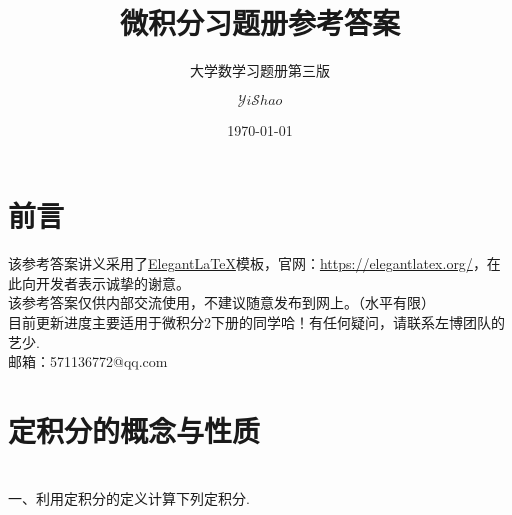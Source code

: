 \documentclass[lang=cn,newtx,10pt,scheme=chinese]{elegantbook}
\title{微积分习题册参考答案}
\subtitle{大学数学习题册第三版}
\author{$\mathcal{Y}i\mathcal{S}hao$}
\date{\today}
\begin{document}
\maketitle
\frontmatter
\chapter*{前言}
该参考答案讲义采用了\href{https://elegantlatex.org/}{Elegant\LaTeX}模板，官网：\href{https://elegantlatex.org/}{https://elegantlatex.org/}，在此向开发者表示诚挚的谢意。\\

该参考答案仅供内部交流使用，不建议随意发布到网上。（水平有限）\\


目前更新进度主要适用于微积分2下册的同学哈！有任何疑问，请联系左博团队的艺少.\\

邮箱：571136772@qq.com

\tableofcontents

\mainmatter





\chapter{定积分的概念与性质}
~\\
一、利用定积分的定义计算下列定积分.\\
\end{document}
